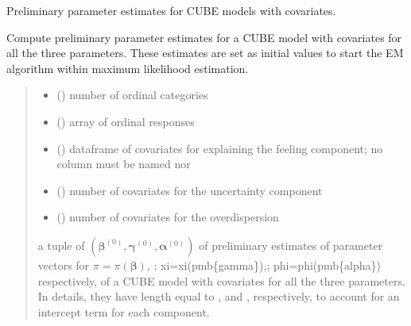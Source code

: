 \documentclass[letterpaper,10pt,english]{sphinxmanual}
\begin{document}
\begin{fulllineitems}
\label{\detokenize{cubmods:cubmods.cube_ywz.init_theta}}
\pysigstartsignatures
{}
\pysigstopsignatures
\sphinxAtStartPar
Preliminary parameter estimates for CUBE models with covariates.

\sphinxAtStartPar
Compute preliminary parameter estimates for a CUBE model with covariates for all the three parameters. 
These estimates are set as initial values to start the E\sphinxhyphen{}M algorithm within maximum likelihood estimation.
\begin{quote}\begin{description}
\begin{itemize}
\item {} 
\sphinxAtStartPar
{} () \textendash{} number of ordinal categories

\item {} 
\sphinxAtStartPar
{} () \textendash{} array of ordinal responses

\item {} 
\sphinxAtStartPar
{} () \textendash{} dataframe of covariates for explaining the feeling component;
no column must be named  nor 

\item {} 
\sphinxAtStartPar
{} () \textendash{} number of covariates for the uncertainty component

\item {} 
\sphinxAtStartPar
{} () \textendash{} number of covariates for the overdispersion

\end{itemize}

\sphinxAtStartPar
a tuple of \((\pmb \beta^{(0)}, \pmb \gamma^{(0)}, \pmb \alpha^{(0)})\) of preliminary estimates of parameter vectors for 
\(\pi = \pi(\pmb{\beta})\), ; xi=xi(pmb\{gamma\}),; phi=phi(pmb\{alpha\})\textasciigrave{} respectively, of a CUBE model with covariates for all the three
parameters. In details, they have length equal to ,  and
, respectively, to account for an intercept term for each component.


\end{description}
\end{quote}
\end{fulllineitems}
\end{document}
